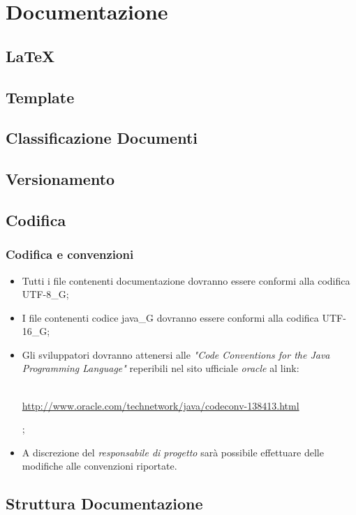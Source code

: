 \section{Documentazione}
\subsection{LaTeX}
\subsection{Template}
\subsection{Classificazione Documenti}
\subsection{Versionamento}
\subsection{Codifica}
\subsubsection{Codifica e convenzioni}
\begin{itemize}

\item Tutti i file contenenti documentazione dovranno essere conformi alla codifica UTF-8_G;

\item I file contenenti codice java_G  dovranno essere conformi alla codifica UTF-16_G;

\item Gli sviluppatori dovranno attenersi alle \textit{"Code Conventions for the Java Programming Language"} reperibili nel sito ufficiale \textit{oracle} al link:\\ \\
\centerline{ \url{http://www.oracle.com/technetwork/java/codeconv-138413.html}};

\item A discrezione del \textit{responsabile di progetto} sarà possibile effettuare delle modifiche alle convenzioni riportate.
\end{itemize}

\subsection{Struttura Documentazione}
